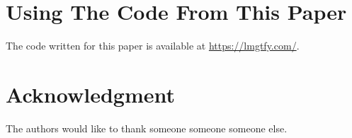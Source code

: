 \appendices
\section{Using The Code From This Paper}        %
The code written for this paper is available at
\url{https://lmgtfy.com/}.

\section*{Acknowledgment}
The authors would like to thank someone someone someone else.
